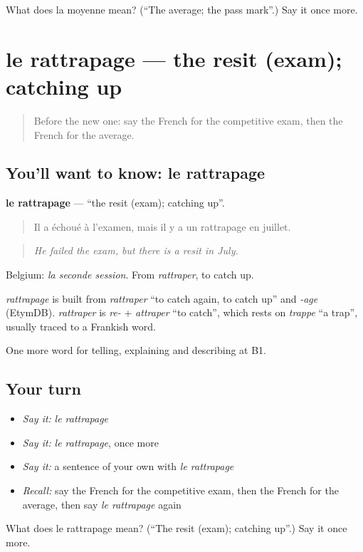 \begin{tcolorbox}[breakable,colback=teal!4,colframe=teal!35!black,title={Before you move on}]
What does la moyenne mean? (\textquotedblleft{}The average; the pass mark\textquotedblright{}.) Say it once more.
\end{tcolorbox}
\section[le rattrapage]{le rattrapage — the resit (exam); catching up}

\label{lesson:FR-C378-rattrapage}



\begin{quote}
Before the new one: say the French for the competitive exam, then the French for the average.
\end{quote}

\subsection*{You'll want to know: le rattrapage}
\textbf{le rattrapage} — \textquotedblleft{}the resit (exam); catching up\textquotedblright{}.

\begin{quote}
Il a échoué à l'examen, mais il y a un rattrapage en juillet.
\end{quote}

\begin{quote}
\emph{He failed the exam, but there is a resit in July.}
\end{quote}

Belgium: \emph{la seconde session}. From \emph{rattraper}, to catch up.

\begin{cousinweb}
\emph{rattrapage} is built from \emph{rattraper} \textquotedblleft{}to catch again, to catch up\textquotedblright{} and \emph{-age} (EtymDB). \emph{rattraper} is \emph{re-} + \emph{attraper} \textquotedblleft{}to catch\textquotedblright{}, which rests on \emph{trappe} \textquotedblleft{}a trap\textquotedblright{}, usually traced to a Frankish word.
\end{cousinweb}

\begin{grammarlens}[title={What you've built}]
One more word for telling, explaining and describing at B1.
\end{grammarlens}

\subsection*{Your turn}
\begin{itemize}
\raggedright
  \item \emph{Say it:} \emph{le rattrapage}
  \item \emph{Say it:} \emph{le rattrapage}, once more
  \item \emph{Say it:} a sentence of your own with \emph{le rattrapage}
  \item \emph{Recall:} say the French for the competitive exam, then the French for the average, then say \emph{le rattrapage} again
\end{itemize}

\begin{tcolorbox}[breakable,colback=teal!4,colframe=teal!35!black,title={Before you move on}]
What does le rattrapage mean? (\textquotedblleft{}The resit (exam); catching up\textquotedblright{}.) Say it once more.
\end{tcolorbox}
